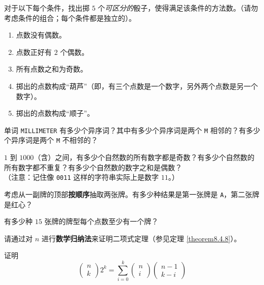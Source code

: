 \begin{exercise}
    对于以下每个条件，找出掷 $5$ 个\emph{可区分的}骰子，使得满足该条件的方法数。（请勿考虑条件的组合；每个条件都是独立的）。
    \begin{enumerate}[label=(\alph*)]
        \item 点数没有偶数。
        \item 点数正好有  $2$ 个偶数。
        \item 所有点数之和为奇数。
        \item 掷出的点数构成``葫芦''（即，有三个点数是一个数字，另外两个点数是另一个数字）。
        \item 掷出的点数构成``顺子''。
    \end{enumerate}
\end{exercise}

\begin{exercise}
    单词 \verb|MILLIMETER| 有多少个异序词？其中有多少个异序词是两个 \verb|M| 相邻的？有多少个异序词是两个 \verb|M| 不相邻的？
\end{exercise}

\begin{exercise}
    $1$ 到 $1000$（含）之间，有多少个自然数的所有数字都是奇数？有多少个自然数的所有数字都不重复？有多少个自然数的数字之和是偶数？\\
    （注意：记住像 \verb|0011| 这样的字符串实际上是数字 $11$。）
\end{exercise}

\begin{exercise}
    考虑从一副牌的顶部\textbf{按顺序}抽取两张牌。有多少种结果是第一张牌是 \verb|A|，第二张牌是红心？
\end{exercise}

\begin{exercise}
    有多少种 $15$ 张牌的牌型每个点数至少有一个牌？
\end{exercise}

\begin{exercise}
    请通过对 $n$ 进行\textbf{数学归纳法}来证明二项式定理（参见定理 \ref{theorem8.4.8}）。
\end{exercise}

\begin{exercise}
    证明
    \[\begin{pmatrix}n\\k\end{pmatrix}2^k = \sum_{i=0}^{k}\begin{pmatrix}n\\i\end{pmatrix}\begin{pmatrix}n-1\\k-i\end{pmatrix}\]
\end{exercise}

